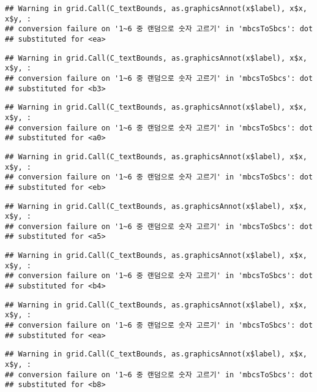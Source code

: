 \documentclass[]{book}
\begin{document}
\begin{verbatim}
## Warning in grid.Call(C_textBounds, as.graphicsAnnot(x$label), x$x, x$y, :
## conversion failure on '1~6 중 랜덤으로 숫자 고르기' in 'mbcsToSbcs': dot
## substituted for <ea>
\end{verbatim}

\begin{verbatim}
## Warning in grid.Call(C_textBounds, as.graphicsAnnot(x$label), x$x, x$y, :
## conversion failure on '1~6 중 랜덤으로 숫자 고르기' in 'mbcsToSbcs': dot
## substituted for <b3>
\end{verbatim}

\begin{verbatim}
## Warning in grid.Call(C_textBounds, as.graphicsAnnot(x$label), x$x, x$y, :
## conversion failure on '1~6 중 랜덤으로 숫자 고르기' in 'mbcsToSbcs': dot
## substituted for <a0>
\end{verbatim}

\begin{verbatim}
## Warning in grid.Call(C_textBounds, as.graphicsAnnot(x$label), x$x, x$y, :
## conversion failure on '1~6 중 랜덤으로 숫자 고르기' in 'mbcsToSbcs': dot
## substituted for <eb>
\end{verbatim}

\begin{verbatim}
## Warning in grid.Call(C_textBounds, as.graphicsAnnot(x$label), x$x, x$y, :
## conversion failure on '1~6 중 랜덤으로 숫자 고르기' in 'mbcsToSbcs': dot
## substituted for <a5>
\end{verbatim}

\begin{verbatim}
## Warning in grid.Call(C_textBounds, as.graphicsAnnot(x$label), x$x, x$y, :
## conversion failure on '1~6 중 랜덤으로 숫자 고르기' in 'mbcsToSbcs': dot
## substituted for <b4>
\end{verbatim}

\begin{verbatim}
## Warning in grid.Call(C_textBounds, as.graphicsAnnot(x$label), x$x, x$y, :
## conversion failure on '1~6 중 랜덤으로 숫자 고르기' in 'mbcsToSbcs': dot
## substituted for <ea>
\end{verbatim}

\begin{verbatim}
## Warning in grid.Call(C_textBounds, as.graphicsAnnot(x$label), x$x, x$y, :
## conversion failure on '1~6 중 랜덤으로 숫자 고르기' in 'mbcsToSbcs': dot
## substituted for <b8>
\end{verbatim}
\end{document}
